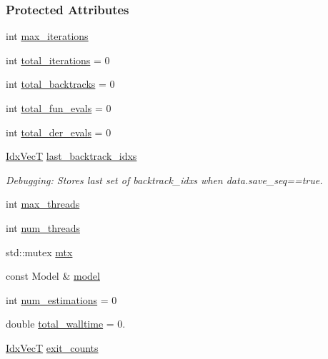 \subsubsection*{Protected Attributes}
\begin{DoxyCompactItemize}
\item 
int \hyperlink{classmappel_1_1estimator_1_1IterativeMaximizer_abf5fe0b08cfbcc403c3d01511726aa38}{max\+\_\+iterations}
\item 
int \hyperlink{classmappel_1_1estimator_1_1IterativeMaximizer_a14a3683e595e1db79b9cbc49b0d8688e}{total\+\_\+iterations} = 0
\item 
int \hyperlink{classmappel_1_1estimator_1_1IterativeMaximizer_a1e081c237c989c530bb101bfb4791073}{total\+\_\+backtracks} = 0
\item 
int \hyperlink{classmappel_1_1estimator_1_1IterativeMaximizer_aa4f49112ff3b145fa1096a7ac4d48af7}{total\+\_\+fun\+\_\+evals} = 0
\item 
int \hyperlink{classmappel_1_1estimator_1_1IterativeMaximizer_a79461b74a026ab06f9d1b4a9f96bdaa0}{total\+\_\+der\+\_\+evals} = 0
\item 
\hyperlink{namespacemappel_ac63743dcd42180127307cd0e4ecdd784}{Idx\+VecT} \hyperlink{classmappel_1_1estimator_1_1IterativeMaximizer_aae10373b4dc244c435059bbc6b0d9704}{last\+\_\+backtrack\+\_\+idxs}
\begin{DoxyCompactList}\small\item\em Debugging\+: Stores last set of backtrack\+\_\+idxs when data.\+save\+\_\+seq==true. \end{DoxyCompactList}\item 
int \hyperlink{classmappel_1_1estimator_1_1ThreadedEstimator_ab4c55ecff71dff47c0584ce20fe7f077}{max\+\_\+threads}
\item 
int \hyperlink{classmappel_1_1estimator_1_1ThreadedEstimator_af746a83929a7217b4084d0e10f850bc3}{num\+\_\+threads}
\item 
std\+::mutex \hyperlink{classmappel_1_1estimator_1_1ThreadedEstimator_af78695378590ff8e822dffe2b1b3f242}{mtx}
\item 
const Model \& \hyperlink{classmappel_1_1estimator_1_1Estimator_a2f157410771fb79a20d4d54e505750d0}{model}
\item 
int \hyperlink{classmappel_1_1estimator_1_1Estimator_a9f5390f0ac3ee127ddcd90dc6f4fd889}{num\+\_\+estimations} = 0
\item 
double \hyperlink{classmappel_1_1estimator_1_1Estimator_a98ad459e850aeb2c42c10fd06c3b9fbc}{total\+\_\+walltime} = 0.
\item 
\hyperlink{namespacemappel_ac63743dcd42180127307cd0e4ecdd784}{Idx\+VecT} \hyperlink{classmappel_1_1estimator_1_1Estimator_aa946d9789a1299d684f83a822a10caa7}{exit\+\_\+counts}
\end{DoxyCompactItemize}
